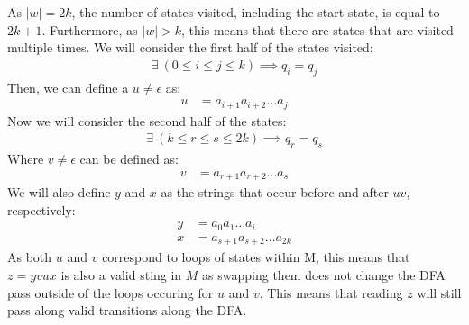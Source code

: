 \documentclass[letterpaper]{article}
\theoremstyle{plain}
\theoremstyle{definition}
\theoremstyle{remark}
\begin{document}
As $|w|=2k$, the number of states visited, including the start state, is equal to $2k+1$. Furthermore, as $|w|>k$, this means that there are states that are visited multiple times. We will consider the first half of the states visited:
\begin{align*}
    \exists~(0\leq{i}\leq{j}\leq{k})\implies{q_i=q_j}
\end{align*}
Then, we can define a $u\neq\epsilon$ as:
\begin{align*}
    u&=a_{i+1}a_{i+2}\dots{a_j}
\end{align*}
Now we will consider the second half of the states:
\begin{align*}
    \exists~(k\leq{r}\leq{s}\leq{2k})\implies{q_r=q_s}
\end{align*}
Where $v\neq\epsilon$ can be defined as:
\begin{align*}
    v&=a_{r+1}a_{r+2}\dots{a_s}
\end{align*}
We will also define $y$ and $x$ as the strings that occur before and after $uv$, respectively:
\begin{align*}
    y&=a_0a_1\dots{a_i}\\
    x&=a_{s+1}a_{s+2}\dots{a_{2k}}
\end{align*}
As both $u$ and $v$ correspond to loops of states within M, this means that $z=yvux$ is also a valid sting in $M$ as swapping them does not change the DFA pass outside of the loops occuring for $u$ and $v$. This means that reading $z$ will still pass along valid transitions along the DFA.
\newpage
\section{}
\end{document}
